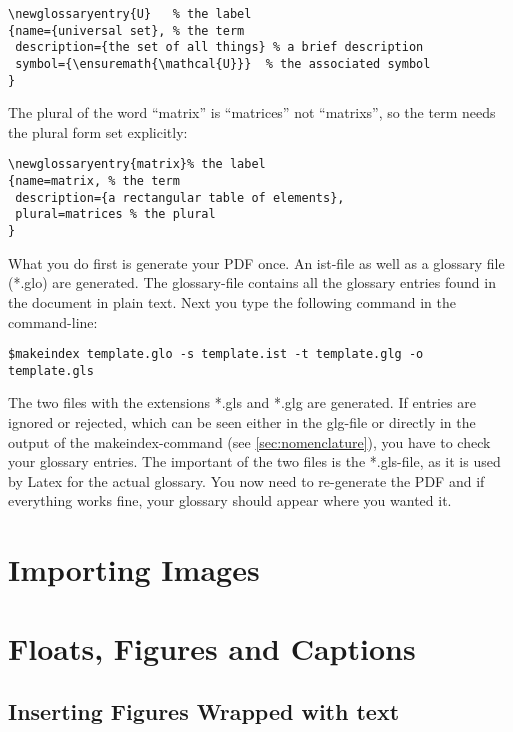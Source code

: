 \begin{verbatim}
\newglossaryentry{U}   % the label
{name={universal set}, % the term
 description={the set of all things} % a brief description
 symbol={\ensuremath{\mathcal{U}}}  % the associated symbol 
}
 \end{verbatim}

The plural of the word ``\gls{matrix}'' is ``matrices'' not ``matrixs'', so the term needs the plural form set explicitly:

 \begin{verbatim}
\newglossaryentry{matrix}% the label
{name=matrix, % the term
 description={a rectangular table of elements}, 
 plural=matrices % the plural
}
 \end{verbatim}
 What you do first is generate your PDF once. An ist-file as well as a glossary file (*.glo) are generated. The glossary-file contains all the glossary entries found in the document in plain text. Next you type the following command in the command-line:
 \begin{verbatim}
$makeindex template.glo -s template.ist -t template.glg -o 
template.gls
 \end{verbatim}
The two files with the extensions *.gls and *.glg are generated. If entries are ignored or rejected, which can be seen either in the glg-file or directly in the output of the makeindex-command (see \ref{sec:nomenclature}), you have to check your glossary entries. The important of the two files is the *.gls-file, as it is used by Latex for the actual glossary. You now need to re-generate the PDF and if everything works fine, your glossary should appear where you wanted it.

\section{Importing Images} %
\label{sec:importing_images}


\section{Floats, Figures and Captions} %
\label{sec:floats_figures_and_captions}

 \subsection{Inserting Figures Wrapped with text} %
 \label{ssec:inserting_images_wrapped_with_text}
 
